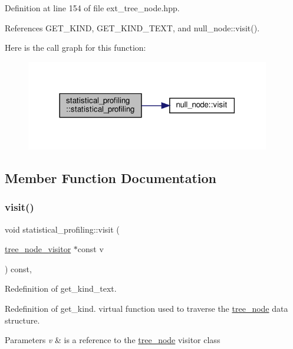 Definition at line 154 of file ext\+\_\+tree\+\_\+node.\+hpp.



References G\+E\+T\+\_\+\+K\+I\+ND, G\+E\+T\+\_\+\+K\+I\+N\+D\+\_\+\+T\+E\+XT, and null\+\_\+node\+::visit().

Here is the call graph for this function\+:
\nopagebreak
\begin{figure}[H]
\begin{center}
\leavevmode
\includegraphics[width=302pt]{d0/d5b/structstatistical__profiling_a920468964d963c708d02f925039ecc1a_cgraph}
\end{center}
\end{figure}


\subsection{Member Function Documentation}
\mbox{\label{structstatistical__profiling_a5f57274294fc3dc9e32ddeec86c8d3d0}} 
\subsubsection{\texorpdfstring{visit()}{visit()}}
{\footnotesize\ttfamily void statistical\+\_\+profiling\+::visit (\begin{DoxyParamCaption}\item[{\hyperlink{classtree__node__visitor}{tree\+\_\+node\+\_\+visitor} $\ast$const}]{v }\end{DoxyParamCaption}) const\hspace{0.3cm}{\ttfamily [override]}, {\ttfamily [virtual]}}



Redefinition of get\+\_\+kind\+\_\+text. 

Redefinition of get\+\_\+kind. virtual function used to traverse the \hyperlink{classtree__node}{tree\+\_\+node} data structure. 
\begin{DoxyParams}{Parameters}
{\em v} & is a reference to the \hyperlink{classtree__node}{tree\+\_\+node} visitor class \\
\hline
\end{DoxyParams}



